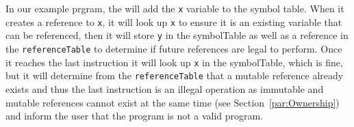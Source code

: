 In our example prgram, the \borrowChecker{} will add the \texttt{x} variable to the
symbol table. When it creates a reference to \texttt{x}, it will look up \texttt{x} to ensure
it is an existing variable that can be referenced, then it will store \texttt{y} in the symbolTable as
well as a reference in the \texttt{referenceTable} to determine if future
references are legal to perform. 
Once it reaches the last instruction it will look up \texttt{x} in the
symbolTable, which is fine, but it will determine from the
\texttt{referenceTable} that a mutable reference already exists and thus the last
instruction is an illegal operation as immutable and mutable references cannot
exist at the same time (see Section~\ref{par:Ownership}) and inform
the user that the program is not a valid \lang{} program.
